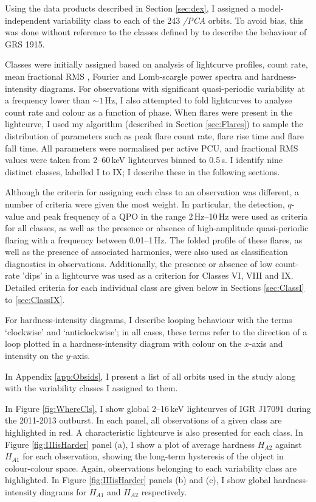 \par Using the data products described in Section \ref{sec:dex}, I assigned a model-independent variability class to each of the 243 \rxte\textit{/PCA} orbits.  To avoid bias, this was done without reference to the classes defined by \citet{Belloni_GRS_MI} to describe the behaviour of GRS 1915.
\par Classes were initially assigned based on analysis of lightcurve profiles, count rate, mean fractional RMS \citep{Vaughan_RMS}, Fourier and Lomb-scargle power spectra and hardness-intensity diagrams.  For observations with significant quasi-periodic variability at a frequency lower than $\sim1$\,Hz, I also attempted to fold lightcurves to analyse count rate and colour as a function of phase.  When flares were present in the lightcurve, I used my algorithm (described in Section \ref{sec:Flares}) to sample the distribution of parameters such as peak flare count rate, flare rise time and flare fall time.  All parameters were normalised per active PCU, and fractional RMS values were taken from 2--60\,keV lightcurves binned to 0.5\,s.  I identify nine distinct classes, labelled I to IX; I describe these in the following sections.
\par Although the criteria for assigning each class to an observation was different, a number of criteria were given the most weight.  In particular, the detection, $q$-value and peak frequency of a QPO in the range 2\,Hz--10\,Hz were used as criteria for all classes, as well as the presence or absence of high-amplitude quasi-periodic flaring with a frequency between 0.01--1\,Hz.  The folded profile of these flares, as well as the presence of associated harmonics, were also used as classification diagnostics in observations.  Additionally, the presence or absence of low count-rate 'dips' in a lightcurve was used as a criterion for Classes VI, VIII and IX.  Detailed criteria for each individual class are given below in Sections \ref{sec:ClassI} to \ref{sec:ClassIX}.
\par For hardness-intensity diagrams, I describe looping behaviour with the terms `clockwise' and `anticlockwise'; in all cases, these terms refer to the direction of a loop plotted in a hardness-intensity diagram with colour on the $x$-axis and intensity on the $y$-axis.
\par In Appendix \ref{app:Obsids}, I present a list of all orbits used in the study along with the variability classes I assigned to them.
\par In Figure \ref{fig:WhereCls}, I show global 2--16\,keV lightcurves of IGR J17091 during the 2011-2013 outburst.  In each panel, all observations of a given class are highlighted in red.  A characteristic lightcurve is also presented for each class.  In Figure \ref{fig:IIIisHarder} panel (a), I show a plot of average hardness $H_{A2}$ against $H_{A1}$ for each observation, showing the long-term hysteresis of the object in colour-colour space.  Again, observations belonging to each variability class are highlighted.  In Figure \ref{fig:IIIisHarder} panels (b) and (c), I show global hardness-intensity diagrams for $H_{A1}$ and $H_{A2}$ respectively.
